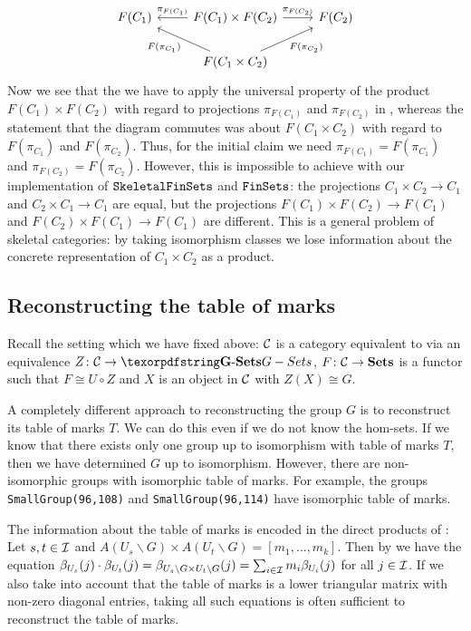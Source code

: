 \begin{rem}
\[\begin{tikzcd}
F(C_1)                    & F(C_1) \times F(C_2) \arrow[r, "\pi_{F(C_2)}"] \arrow[l, "\pi_{F(C_1)}"']                          & F(C_2)                   \\
                        & F(C_1 \times C_2) \arrow[ru, "F(\pi_{C_2})"'] \arrow[lu, "F(\pi_{C_1})"]                               &                       
\end{tikzcd}
\]
Now we see that the we have to apply the universal property of the product $F(C_1) \times F(C_2)$ with regard to projections $\pi_{F(C_1)}$ and $\pi_{F(C_2)}$ in \Set{}, whereas the statement that the diagram commutes was about $F(C_1 \times C_2)$ with regard to $F(\pi_{C_1})$ and $F(\pi_{C_2})$. Thus, for the initial claim we need $\pi_{F(C_1)} = F(\pi_{C_1})$ and $\pi_{F(C_2)} = F(\pi_{C_2})$. However, this is impossible to achieve with our implementation of ${\texttt{SkeletalFinSets}}$ and ${\texttt{FinSets}}$: the projections $C_1 \times C_2 \to C_1$ and $C_2 \times C_1 \to C_1$ are equal, but the projections $F(C_1) \times F(C_2) \to F(C_1)$ and $F(C_2) \times F(C_1) \to F(C_1)$ are different. This is a general problem of skeletal categories: by taking isomorphism classes we lose information about the concrete representation of $C_1 \times C_2$ as a product.
\end{rem}

\subsection{Reconstructing the table of marks}

Recall the setting which we have fixed above: $\mathcal{C}$ is a category equivalent to \Gset{} via an equivalence $Z \colon \Ccal \to \Gset$, $F\colon \mathcal{C} \to {\ensuremath{{\operatorname{\mathbf{Sets}}}}}$ is a functor such that $F \cong U \circ Z$ and $X$ is an object in $\mathcal{C}$ with $Z(X) \cong G$.

A completely different approach to reconstructing the group $G$ is to reconstruct its table of marks $T$. We can do this even if we do not know the hom-sets. If we know that there exists only one group up to isomorphism with table of marks $T$, then we have determined $G$ up to isomorphism. However, there are non-isomorphic groups with isomorphic table of marks. For example, the \GAP{} groups \texttt{SmallGroup(96,108)} and \texttt{SmallGroup(96,114)} have isomorphic table of marks.

\begin{rem}[Idea]\label{rem:information_of_marks_in_products}
The information about the table of marks is encoded in the direct products of \SkeletalGSets{}: Let $s,t \in \mathcal{I}$ and $A(U_s \backslash G) \times A(U_t \backslash G) = [m_1,\dots,m_k]$. Then by  we have the equation $\beta_{U_s}(j) \cdot \beta_{U_t}(j) = \beta_{U_s \backslash G \times U_t \backslash G}(j) = \sum_{i \in \mathcal{I}} m_i \beta_{U_i}(j)$ for all $j \in \mathcal{I}$. If we also take into account that the table of marks is a lower triangular matrix with non-zero diagonal entries, taking all such equations is often sufficient to reconstruct the table of marks.
\end{rem}

